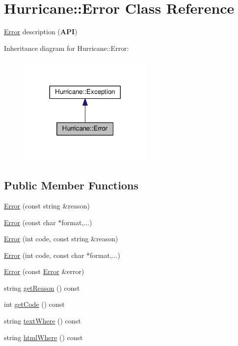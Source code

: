 \hypertarget{classHurricane_1_1Error}{}\section{Hurricane\+:\+:Error Class Reference}
\label{classHurricane_1_1Error}


\mbox{\hyperlink{classHurricane_1_1Error}{Error}} description ({\bfseries A\+PI})  




Inheritance diagram for Hurricane\+:\+:Error\+:\nopagebreak
\begin{figure}[H]
\begin{center}
\leavevmode
\includegraphics[width=188pt]{classHurricane_1_1Error__inherit__graph}
\end{center}
\end{figure}
\subsection*{Public Member Functions}
\begin{DoxyCompactItemize}
\item 
\mbox{\hyperlink{classHurricane_1_1Error_ab58387c890740ed8082532c5342f2d03}{Error}} (const string \&reason)
\item 
\mbox{\hyperlink{classHurricane_1_1Error_a98f50dcce8258982d450e8f5f79cff38}{Error}} (const char $\ast$format,...)
\item 
\mbox{\hyperlink{classHurricane_1_1Error_a33e4d2a1ea71be6395dc2716b68378c8}{Error}} (int code, const string \&reason)
\item 
\mbox{\hyperlink{classHurricane_1_1Error_a32ccc14fe29d7d2a7b5fe66ee0a3845c}{Error}} (int code, const char $\ast$format,...)
\item 
\mbox{\hyperlink{classHurricane_1_1Error_a7d90d5f5727dab2a9cc0a6427fb2b084}{Error}} (const \mbox{\hyperlink{classHurricane_1_1Error}{Error}} \&error)
\item 
string \mbox{\hyperlink{classHurricane_1_1Error_a1a18927a2d4eb2b0b0acfc2908be7008}{get\+Reason}} () const
\item 
int \mbox{\hyperlink{classHurricane_1_1Error_a1ba11c6ba6eff9fdf2923520fe80a6b2}{get\+Code}} () const
\item 
string \mbox{\hyperlink{classHurricane_1_1Error_ab3b8bb521802f332340eaf0b37eb1dfc}{text\+Where}} () const
\item 
string \mbox{\hyperlink{classHurricane_1_1Error_afafcbeae105f75906c7c45024de41c18}{html\+Where}} () const
\end{DoxyCompactItemize}

